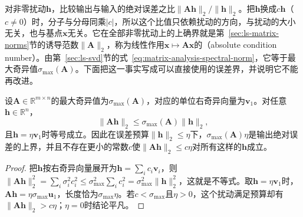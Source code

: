 对非零扰动$\bm h$，比较输出与输入的绝对误差之比$\lVert\bm A\bm h\rVert_2/\lVert\bm h\rVert_2$。把$\bm h$换成$c\bm h$（$c\neq0$）时，分子与分母同乘$|c|$，所以这个比值只依赖扰动的方向，与扰动的大小无关，也与基点$\bm x$无关。它在全部非零扰动上的上确界就是第~\ref{sec:ls-matrix-norms}节的诱导范数$\lVert\bm A\rVert_2$，称为线性作用$\bm x\mapsto\bm A\bm x$的（absolute condition number）。由第~\ref{sec:ls-svd}节的式~\eqref{eq:matrix-analysis-spectral-norm}，它等于最大奇异值$\sigma_{\max}(\bm A)$。下面把这一事实写成可以直接使用的误差界，并说明它不能再改进。

\begin{theorem}[线性作用的绝对误差界]
\label{thm:ls-absolute-error-bound}
设$\bm A\in\mathbb R^{m\times n}$的最大奇异值为$\sigma_{\max}(\bm A)$，对应的单位右奇异向量为$\bm v_1$。对任意$\bm h\in\mathbb R^n$，
\[
 \lVert\bm A\bm h\rVert_2\leq\sigma_{\max}(\bm A)\lVert\bm h\rVert_2 ,
\]
且$\bm h=\eta\bm v_1$时等号成立。因此在误差预算$\lVert\bm h\rVert_2\leq\eta$下，$\sigma_{\max}(\bm A)\eta$是输出绝对误差的上界，并且不存在更小的常数$c$使$\lVert\bm A\bm h\rVert_2\leq c\eta$对所有这样的$\bm h$成立。
\end{theorem}
\begin{proof}
把$\bm h$按右奇异向量展开为$\bm h=\sum_ic_i\bm v_i$，则$\lVert\bm A\bm h\rVert_2^2=\sum_i\sigma_i^2c_i^2\leq\sigma_{\max}^2\sum_ic_i^2=\sigma_{\max}^2\lVert\bm h\rVert_2^2$，这就是不等式。取$\bm h=\eta\bm v_1$时，$\bm A\bm h=\eta\sigma_{\max}\bm u_1$，长度恰为$\sigma_{\max}\eta$。若$c<\sigma_{\max}$且$\eta>0$，这个扰动满足预算却有$\lVert\bm A\bm h\rVert_2>c\eta$；$\eta=0$时结论平凡。
\end{proof}

